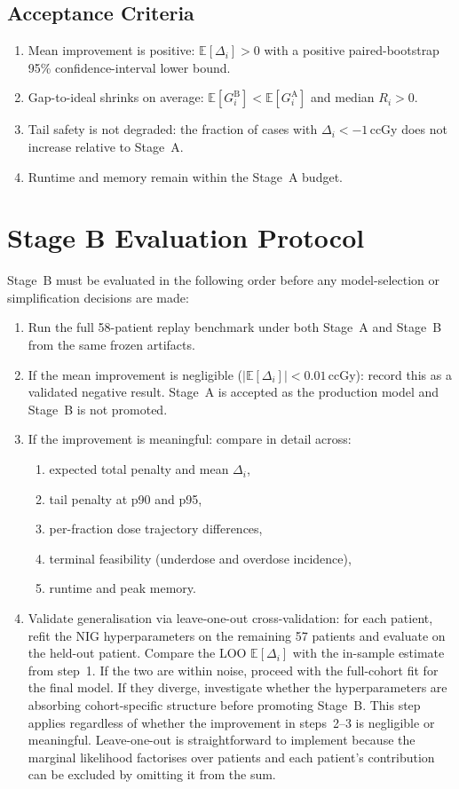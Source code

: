 \documentclass[11pt]{article}
\begin{document}
\subsection{Acceptance Criteria}
\begin{enumerate}
\item Mean improvement is positive: $\mathbb{E}[\Delta_i] > 0$ with a positive paired-bootstrap 95\% confidence-interval lower bound.
\item Gap-to-ideal shrinks on average: $\mathbb{E}[G_i^{\mathrm{B}}] < \mathbb{E}[G_i^{\mathrm{A}}]$ and median $R_i > 0$.
\item Tail safety is not degraded: the fraction of cases with $\Delta_i < -1$\,ccGy does not increase relative to Stage~A.
\item Runtime and memory remain within the Stage~A budget.
\end{enumerate}

\section{Stage B Evaluation Protocol}

Stage~B must be evaluated in the following order before any model-selection or simplification decisions are made:

\begin{enumerate}
\item Run the full 58-patient replay benchmark under both Stage~A and Stage~B from the same frozen artifacts.
\item If the mean improvement is negligible ($|\mathbb{E}[\Delta_i]| < 0.01$\,ccGy): record this as a validated negative result. Stage~A is accepted as the production model and Stage~B is not promoted.
\item If the improvement is meaningful: compare in detail across:
\begin{enumerate}
\item expected total penalty and mean $\Delta_i$,
\item tail penalty at p90 and p95,
\item per-fraction dose trajectory differences,
\item terminal feasibility (underdose and overdose incidence),
\item runtime and peak memory.
\end{enumerate}
\item Validate generalisation via leave-one-out cross-validation: for each patient, refit the NIG hyperparameters on the remaining 57 patients and evaluate on the held-out patient. Compare the LOO $\mathbb{E}[\Delta_i]$ with the in-sample estimate from step~1. If the two are within noise, proceed with the full-cohort fit for the final model. If they diverge, investigate whether the hyperparameters are absorbing cohort-specific structure before promoting Stage~B. This step applies regardless of whether the improvement in steps~2--3 is negligible or meaningful. Leave-one-out is straightforward to implement because the marginal likelihood factorises over patients and each patient's contribution can be excluded by omitting it from the sum.
\end{enumerate}
\end{document}
